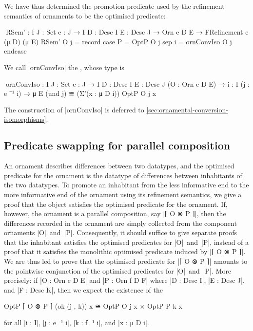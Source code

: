 We have thus determined the promotion predicate used by the refinement semantics of ornaments to be the optimised predicate:
\begin{code}
^^^RSem' :  {I J : Set} {e : J → I} {D : Desc I} {E : Desc J} →
            Orn e D E → FRefinement e (μ D) (μ E)
RSem' O j = record  case  P  = OptP O j
                    sep   i  = ornConvIso O j endcase
\end{code}
We call |ornConvIso| the , whose type is
\begin{code}
^^^ornConvIso :
  {I J : Set} {e : J → I} {D : Desc I} {E : Desc J} (O : Orn e D E) →
  {i : I} (j : e ⁻¹ i) → μ E (und j) ≅ (Σ'(x : μ D i)) OptP O j x
\end{code}
The construction of |ornConvIso| is deferred to \autoref{sec:ornamental-conversion-isomorphisms}.

\subsection{Predicate swapping for parallel composition}
\label{sec:predicate-swapping}

An ornament describes differences between two datatypes, and the optimised predicate for the ornament is the datatype of differences between inhabitants of the two datatypes.
To promote an inhabitant from the less informative end to the more informative end of the ornament using its refinement semantics, we give a proof that the object satisfies the optimised predicate for the ornament.
If, however, the ornament is a parallel composition, say |⌈ O ⊗ P ⌉|, then the differences recorded in the ornament are simply collected from the component ornaments |O|~and~|P|.
Consequently, it should suffice to give separate proofs that the inhabitant satisfies the optimised predicates for |O|~and~|P|, instead of a proof that it satisfies the monolithic optimised predicate induced by |⌈ O ⊗ P ⌉|.
We are thus led to prove that the optimised predicate for |⌈ O ⊗ P ⌉| amounts to the pointwise conjunction of the optimised predicates for |O|~and~|P|.
More precisely: if |O : Orn e D E| and |P : Orn f D F| where |D : Desc I|, |E : Desc J|, and |F : Desc K|, then we expect the existence of the 
\begin{code}
OptP ⌈ O ⊗ P ⌉ (ok (j , k)) x ≅ OptP O j x × OptP P k x
\end{code}
for all |i : I|, |j : e ⁻¹ i|, |k : f ⁻¹ i|, and |x : μ D i|.


